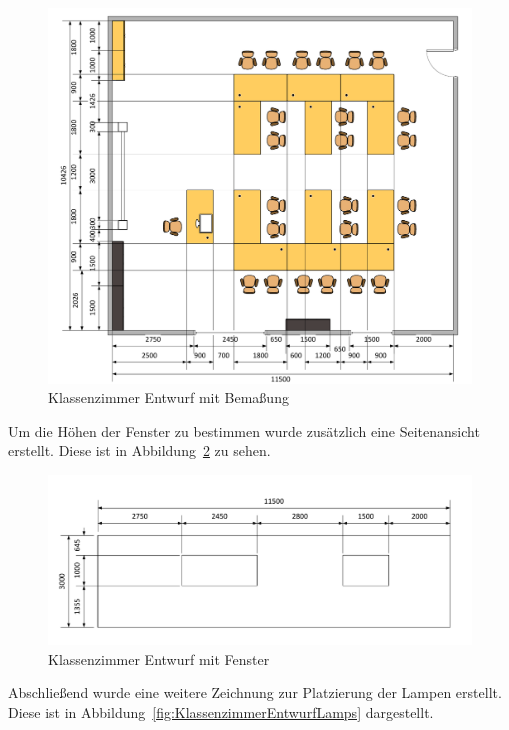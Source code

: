 \begin{figure}[H]
  \centering
  \includegraphics[width=1\textwidth]{images/classroom_draw.pdf}
  \caption{Klassenzimmer Entwurf mit Bemaßung}
  \label{fig:KlassenzimmerEntwurf}
\end{figure}\noindent
Um die Höhen der Fenster zu bestimmen wurde zusätzlich eine Seitenansicht erstellt.
Diese ist in Abbildung~\ref{fig:KlassenzimmerEntwurfWindows} zu sehen.
\begin{figure}[H]
  \centering
  \includegraphics[width=1\textwidth]{images/classroom_draw_windows.pdf}
  \caption{Klassenzimmer Entwurf mit Fenster}
  \label{fig:KlassenzimmerEntwurfWindows}
\end{figure}\noindent
Abschließend wurde eine weitere Zeichnung zur Platzierung der Lampen erstellt. Diese ist in Abbildung~\ref{fig:KlassenzimmerEntwurfLamps}
dargestellt.
